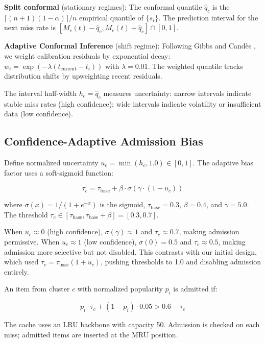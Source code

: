 \documentclass[11pt,letterpaper]{article}
\begin{document}
\textbf{Split conformal} (stationary regimes): The conformal quantile $\hat{q}_c$ is the $\lceil(n+1)(1-\alpha)\rceil/n$ empirical quantile of $\{s_i\}$. The prediction interval for the next miss rate is $[M_c(t) - \hat{q}_c, M_c(t) + \hat{q}_c] \cap [0,1]$.

\textbf{Adaptive Conformal Inference} (shift regime): Following Gibbs and Cand\`es \citep{Gibbs2021}, we weight calibration residuals by exponential decay: $w_i = \exp(-\lambda(t_{\text{current}} - t_i))$ with $\lambda = 0.01$. The weighted quantile tracks distribution shifts by upweighting recent residuals.

The interval half-width $h_c = \hat{q}_c$ measures uncertainty: narrow intervals indicate stable miss rates (high confidence); wide intervals indicate volatility or insufficient data (low confidence).

\subsection{Confidence-Adaptive Admission Bias}

Define normalized uncertainty $u_c = \min(h_c, 1.0) \in [0, 1]$. The adaptive bias factor uses a soft-sigmoid function:

\begin{equation}
  \tau_c = \tau_{\text{base}} + \beta \cdot \sigma(\gamma \cdot (1 - u_c))
\end{equation}

where $\sigma(x) = 1/(1 + e^{-x})$ is the sigmoid, $\tau_{\text{base}} = 0.3$, $\beta = 0.4$, and $\gamma = 5.0$. The threshold $\tau_c \in [\tau_{\text{base}}, \tau_{\text{base}} + \beta] = [0.3, 0.7]$.

When $u_c \approx 0$ (high confidence), $\sigma(\gamma) \approx 1$ and $\tau_c \approx 0.7$, making admission permissive. When $u_c \approx 1$ (low confidence), $\sigma(0) = 0.5$ and $\tau_c \approx 0.5$, making admission more selective but not disabled. This contrasts with our initial design, which used $\tau_c = \tau_{\text{base}}(1 + u_c)$, pushing thresholds to 1.0 and disabling admission entirely.

An item from cluster $c$ with normalized popularity $p_i$ is admitted if:

\begin{equation}
  p_i \cdot \tau_c + (1 - p_i) \cdot 0.05 > 0.6 - \tau_c
\end{equation}

The cache uses an LRU backbone with capacity 50. Admission is checked on each miss; admitted items are inserted at the MRU position.
\end{document}
